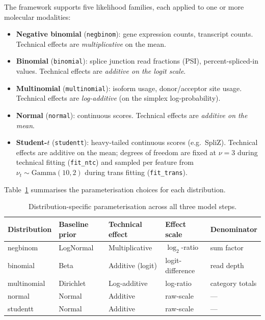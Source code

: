 \documentclass[12pt]{article}
\begin{document}
The framework supports five likelihood families, each applied to one or more molecular modalities:
\begin{itemize}
  \item \textbf{Negative binomial} (\texttt{negbinom}): gene expression counts,
        transcript counts. Technical effects are \emph{multiplicative} on the mean.
  \item \textbf{Binomial} (\texttt{binomial}): splice junction read fractions (PSI),
        percent-spliced-in values. Technical effects are \emph{additive on the logit scale}.
  \item \textbf{Multinomial} (\texttt{multinomial}): isoform usage, donor/acceptor site
        usage. Technical effects are \emph{log-additive} (on the simplex log-probability).
  \item \textbf{Normal} (\texttt{normal}): continuous scores. Technical
        effects are \emph{additive on the mean}.
  \item \textbf{Student-$t$} (\texttt{studentt}): heavy-tailed continuous scores (e.g.\ SpliZ).
        Technical effects are additive on the mean; degrees of freedom are fixed at $\nu = 3$
        during technical fitting (\texttt{fit\_ntc}) and sampled per feature from
        $\nu_t \sim \mathrm{Gamma}(10, 2)$ during trans fitting (\texttt{fit\_trans}).
\end{itemize}

\medskip
\noindent Table~\ref{tab:distributions} summarises the parameterisation choices for each
distribution.

\begin{table}[htbp]
  \centering
  \caption{Distribution-specific parameterisation across all three model steps.}
  \label{tab:distributions}
  \begin{tabular}{lllll}
    \toprule
    Distribution & Baseline prior & Technical effect & Effect scale & Denominator \\
    \midrule
    negbinom    & LogNormal        & Multiplicative   & $\log_2$-ratio  & sum factor \\
    binomial    & Beta             & Additive (logit) & logit-difference & read depth \\
    multinomial & Dirichlet        & Log-additive     & log-ratio       & category totals \\
    normal      & Normal           & Additive         & raw-scale       & --- \\
    studentt    & Normal           & Additive         & raw-scale       & --- \\
    \bottomrule
  \end{tabular}
\end{table}
\end{document}

